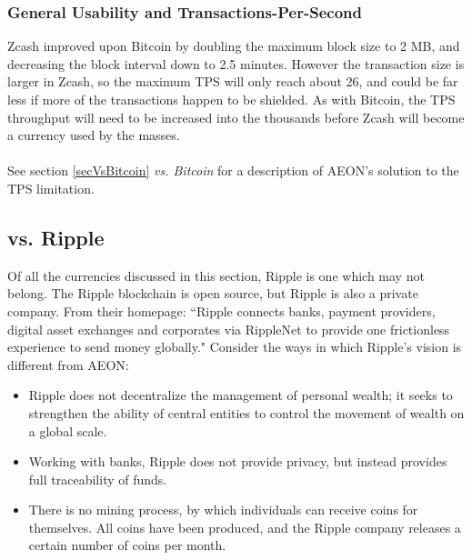 \subsubsection{General Usability and Transactions-Per-Second}
Zcash improved upon Bitcoin by doubling the maximum block size to 2 MB, and decreasing the block interval down to 2.5 minutes.  However the transaction size is larger in Zcash, so the maximum TPS will only reach about 26, and could be far less if more of the transactions happen to be shielded.  As with Bitcoin, the TPS throughput will need to be increased into the thousands before Zcash will become a currency used by the masses.\\
\\
See section \ref{secVsBitcoin} \textit{vs. Bitcoin} for a description of AEON’s solution to the TPS limitation.

\subsection{vs. Ripple}
Of all the currencies discussed in this section, Ripple is one which may not belong.  The Ripple blockchain is open source, but Ripple is also a private company.  From their homepage:  “Ripple connects banks, payment providers, digital asset exchanges and corporates via RippleNet to provide one frictionless experience to send money globally."  Consider the ways in which Ripple's vision is different from AEON:

\begin{itemize}
	\item Ripple does not decentralize the management of personal wealth; it seeks to strengthen the ability of central entities to control the movement of wealth on a global scale.
	\item Working with banks, Ripple does not provide privacy, but instead provides full traceability of funds.
	\item There is no mining process, by which individuals can receive coins for themselves.  All coins have been produced, and the Ripple company releases a certain number of coins per month.
\end{itemize}

